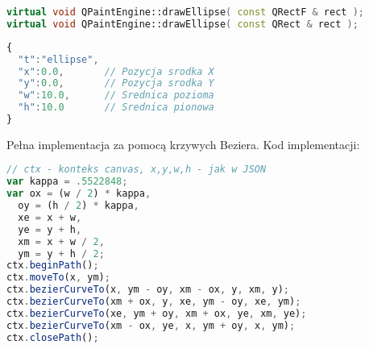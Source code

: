 \begin{lstlisting}[language=C++,numbers=none]
virtual void QPaintEngine::drawEllipse( const QRectF & rect );
virtual void QPaintEngine::drawEllipse( const QRect & rect );
\end{lstlisting}
\begin{lstlisting}[language=JavaScript,numbers=none]
{
  "t":"ellipse",
  "x":0.0,       // Pozycja srodka X
  "y":0.0,       // Pozycja srodka Y
  "w":10.0,      // Srednica pozioma
  "h":10.0       // Srednica pionowa
}
\end{lstlisting}

Pełna implementacja za pomocą krzywych Beziera.
Kod implementacji:

\begin{lstlisting}[language=JavaScript,numbers=none]
// ctx - konteks canvas, x,y,w,h - jak w JSON
var kappa = .5522848;
var ox = (w / 2) * kappa,
  oy = (h / 2) * kappa,
  xe = x + w,
  ye = y + h,
  xm = x + w / 2,
  ym = y + h / 2;
ctx.beginPath();
ctx.moveTo(x, ym);
ctx.bezierCurveTo(x, ym - oy, xm - ox, y, xm, y);
ctx.bezierCurveTo(xm + ox, y, xe, ym - oy, xe, ym);
ctx.bezierCurveTo(xe, ym + oy, xm + ox, ye, xm, ye);
ctx.bezierCurveTo(xm - ox, ye, x, ym + oy, x, ym);
ctx.closePath();
\end{lstlisting}